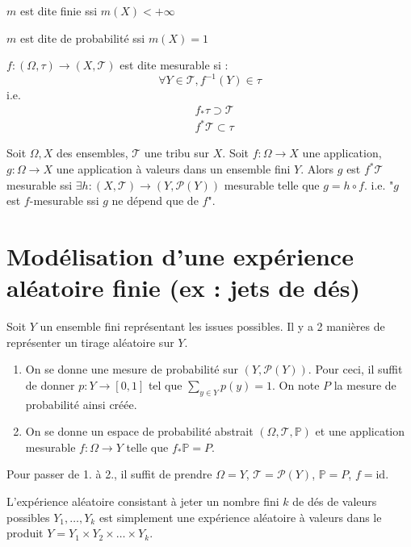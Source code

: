 \documentclass[10pt,a4paper,notitlepage ]{report}
\begin{document}
\begin{definition}
	$m$ est dite finie ssi $m(X) < +\infty$
\end{definition}
\begin{definition}
	$m$ est dite de probabilité ssi $m(X)=1$
\end{definition}

\begin{definition}
	$f:(\Omega,\tau) \rightarrow (X,\mathcal T)$ est dite mesurable si : \[\forall Y \in \mathcal T, f^{-1}(Y) \in \tau\] i.e.
	\begin{align*}
		&f_*\tau \supset \mathcal T \\
		&f^*\mathcal T \subset \tau
	\end{align*}
\end{definition}

\begin{exo}
	Soit $\Omega, X$ des ensembles, $\mathcal T$ une tribu sur $X$. Soit $f:\Omega \rightarrow X$ une application, $g:\Omega\rightarrow X$ une application à valeurs dans un ensemble fini $Y$. Alors $g$ est $f^*\mathcal T$ mesurable ssi $\exists h:(X,\mathcal T) \rightarrow (Y,\mathcal P(Y))$ mesurable telle que $g=h \circ f$. i.e. "$g$ est $f$-mesurable ssi $g$ ne dépend que de $f$".
\end{exo}

\section{Modélisation d'une expérience aléatoire finie (ex : jets de dés)}

Soit $Y$ un ensemble fini représentant les issues possibles. Il y a 2 manières de représenter un tirage aléatoire sur $Y$.
\begin{enumerate}
	\item On se donne une mesure de probabilité sur $(Y,\mathcal P(Y))$. Pour ceci, il suffit de donner $p:Y\rightarrow[0,1]$ tel que $\sum_{y\in Y}p(y) = 1$. On note $P$ la mesure de probabilité ainsi créée.
	\item On se donne un espace de probabilité abstrait $(\Omega,\mathcal T, \mathbb P)$ et une application mesurable $f:\Omega \rightarrow Y$ telle que $f_*\mathbb P=P$.
\end{enumerate}
Pour passer de 1. à 2., il suffit de prendre $\Omega = Y$, $\mathcal T = \mathcal P(Y)$, $\mathbb P = P$, $f=\mathrm {id}$.

L'expérience aléatoire consistant à jeter un nombre fini $k$ de dés de valeurs possibles $Y_1, \dots, Y_k$ est simplement une expérience aléatoire à valeurs dans le produit $Y=Y_1 \times Y_2 \times \dots\times Y_k$.
\end{document}
